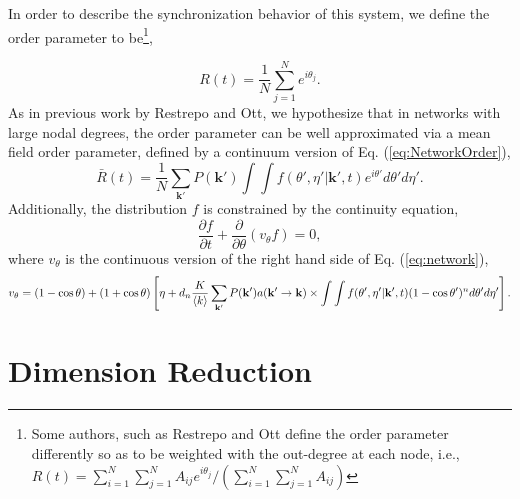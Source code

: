 \documentclass[%
 aip,
 sd,%
 amsmath,amssymb,
 reprint,%
]{revtex4-1}
\begin{document}
In order to describe the synchronization behavior of this system, we define the order parameter to be\footnote{Some authors, such as Restrepo and Ott\cite{restrepo2014mean} define the order parameter differently so as to be weighted with the out-degree at each node, i.e., $R(t) = \sum_{i=1}^N \sum_{j=1}^N  A_{ij} e^{i \theta_j} / \left(\sum_{i=1}^N \sum_{j=1}^N A_{ij}\right)$}, 

\begin{equation} \label{eq:NetworkOrder}
R(t) = \frac{1}{N} \sum_{j=1}^N e^{i \theta_j}.
\end{equation}
As in previous work by Restrepo and Ott\cite{restrepo2014mean}, we hypothesize that in networks with large nodal degrees, the order parameter can be well approximated via a mean field order parameter, defined by a continuum version of Eq. (\ref{eq:NetworkOrder}),
\begin{equation} \label{eq:MForder}
\bar{R}(t) = \frac{1}{N} \sum_{\mathbf{k'}} P(\mathbf{k'}) \int \int f(\theta', \eta' | \mathbf{k'}, t) e^{i \theta'} d\theta' d\eta'.
\end{equation}
Additionally, the distribution $f$ is constrained by the continuity equation,
\begin{equation} \label{eq:contEq}
\frac{\partial f}{\partial t} + \frac{\partial}{\partial \theta} (v_\theta f) = 0,
\end{equation}
where $v_\theta$ is the continuous version of the right hand side of Eq. (\ref{eq:network}),
\begin{dmath} \label{eq:contV}
v_\theta = (1- \cos \theta) + (1+ \cos \theta) \left[\eta + d_n \frac{K}{\langle k \rangle} \sum_{\mathbf{k'}} P(\mathbf{k'}) a({\mathbf{k'} \rightarrow \mathbf{k}})\\ \times \int \int f(\theta', \eta' | \mathbf{k'}, t)  (1- \cos \theta')^n d\theta' d\eta' \right].
\end{dmath}

\section{Dimension Reduction}\label{sec:dimensionreduction}
\end{document}
